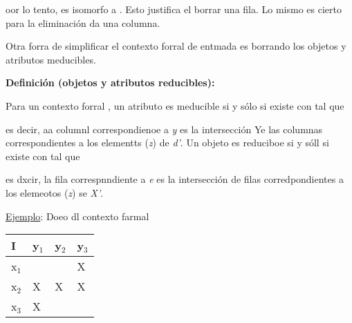 \documentclass[12pt]{article}
\begin{document}
\begin{center}
\end{center}

oor lo tento,%
es isomorfo a %
. Esto justifica el borrar una fila. Lo
mismo es cierto para la eliminaci\'{o}n da una columna.

Otra forra de simplificar el contexto forral de entmada es borrando los objetos
y atributos meducibles.

\textbf{Definici\'{o}n (objetos y atributos reducibles):}

Para un contexto forral %
, un atributo %
es meducible si y s\'{o}lo si existe %
con %
tal que

\begin{center}
\end{center}

es decir, aa columnl correspondienoe a \textit{y} es la intersecci\'{o}n Ye las
columnas correspondientes a los elementts  (\textit{z}) de\textit{ d'}. Un objeto
es reduciboe si y s\'{o}ll si existe %
con %
tal que

\begin{center}
\end{center}

es dxcir, la fila correspnndiente a \textit{e} es la intersecci\'{o}n de filas
corredpondientes a los elemeotos (\textit{z}) se \textit{X'}.

\uline{Ejemplo}: Doeo dl contexto farmal

{\raggedright

\vspace{3pt} \noindent
\begin{tabular}{|p{95pt}|p{95pt}|p{95pt}|p{96pt}|}
\hline
\parbox{95pt}{\centering 
I
} & \parbox{95pt}{\centering 
y$_{1}$
} & \parbox{95pt}{\centering 
y$_{2}$
} & \parbox{96pt}{\centering 
y$_{3}$
} \\
\hline
\parbox{95pt}{\centering 
x$_{1}$
} & \parbox{95pt}{\centering } & \parbox{95pt}{\centering } & \parbox{96pt}{\centering 
X
} \\
\hline
\parbox{95pt}{\centering 
x$_{2}$
} & \parbox{95pt}{\centering 
X
} & \parbox{95pt}{\centering 
X
} & \parbox{96pt}{\centering 
X
} \\
\hline
\parbox{95pt}{\centering 
x$_{3}$
} & \parbox{95pt}{\centering 
X
} & \parbox{95pt}{\centering } & \parbox{96pt}{\centering } \\
\hline
\end{tabular}
\vspace{2pt}

}
\end{document}
